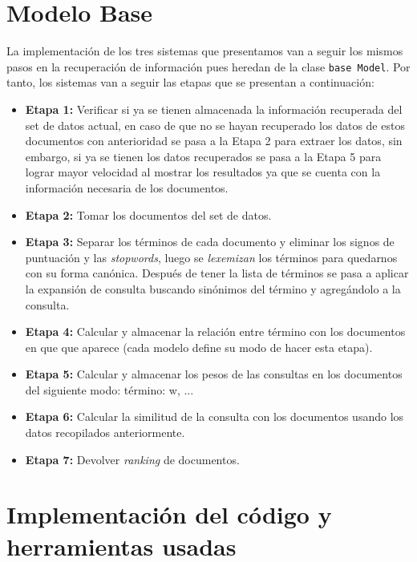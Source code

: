 \documentclass[spanish]{article}
\begin{document}
	\section*{Modelo Base}
		La implementación de los tres sistemas que presentamos van a seguir los mismos pasos en la recuperación de información pues heredan de la clase \texttt{base Model}. Por tanto, los sistemas van a seguir las etapas que se presentan a continuación:

			\begin{itemize}
				\item \textbf{Etapa 1:} Verificar si ya se tienen almacenada la información recuperada del set de datos actual, en caso de que no se hayan recuperado los datos de estos documentos con anterioridad se pasa a la Etapa 2 para extraer los datos, sin embargo, si ya se tienen los datos recuperados se pasa a la Etapa 5 para lograr mayor velocidad al mostrar los resultados ya que se cuenta con la información necesaria de los documentos.

				\item \textbf{Etapa 2:} Tomar los documentos del set de datos.

				\item \textbf{Etapa 3:}  Separar los términos de cada documento y eliminar los signos de puntuación y las \emph{stopwords}, luego se \emph{lexemizan} los términos para quedarnos con su forma canónica. Después de tener la lista de términos se pasa a aplicar la expansión de consulta buscando sinónimos del término y agregándolo a la consulta.

				\item \textbf{Etapa 4:} Calcular y almacenar la relación entre término con los documentos en que que aparece (cada modelo define su modo de hacer esta etapa).

				\item \textbf{Etapa 5:} Calcular y almacenar los pesos de las consultas en los documentos del siguiente modo: {término: w, ...}

				\item \textbf{Etapa 6:} Calcular la similitud de la consulta con los documentos usando los datos recopilados anteriormente.

				\item \textbf{Etapa 7:} Devolver \emph{ranking} de documentos.

			\end{itemize}	

	\section*{Implementación del código y herramientas usadas}
		
\end{document}
